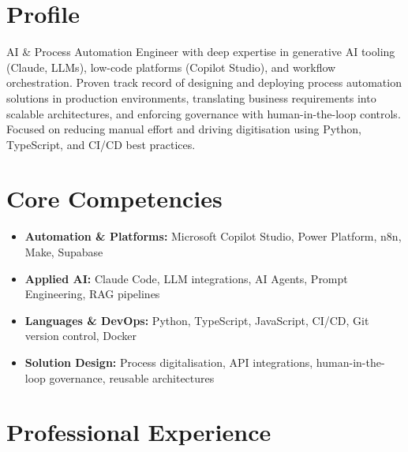 \documentclass[11pt,a4paper,sans]{moderncv}
\begin{document}
\makecvtitle

\section{Profile}
AI \& Process Automation Engineer with deep expertise in generative AI tooling (Claude, LLMs), low-code platforms (Copilot Studio), and workflow orchestration. Proven track record of designing and deploying process automation solutions in production environments, translating business requirements into scalable architectures, and enforcing governance with human-in-the-loop controls. Focused on reducing manual effort and driving digitisation using Python, TypeScript, and CI/CD best practices.

\section{Core Competencies}
\begin{itemize}
\item \textbf{Automation \& Platforms:} Microsoft Copilot Studio, Power Platform, n8n, Make, Supabase
\item \textbf{Applied AI:} Claude Code, LLM integrations, AI Agents, Prompt Engineering, RAG pipelines
\item \textbf{Languages \& DevOps:} Python, TypeScript, JavaScript, CI/CD, Git version control, Docker
\item \textbf{Solution Design:} Process digitalisation, API integrations, human-in-the-loop governance, reusable architectures
\end{itemize}

\section{Professional Experience}

\end{document}
